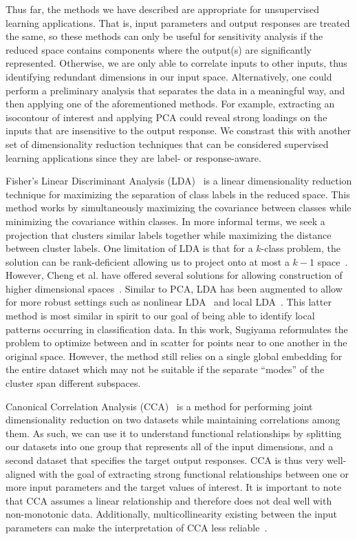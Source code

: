 Thus far, the methods we have described are appropriate for unsupervised learning applications.
%
That is, input parameters and output responses are treated the same, so these methods can only be useful for sensitivity analysis if the reduced space contains components where the output(s) are significantly represented.
%
Otherwise, we are only able to correlate inputs to other inputs, thus identifying redundant dimensions in our input space.
%
Alternatively, one could perform a preliminary analysis that separates the data in a meaningful way, and then applying one of the aforementioned methods.
%
For example, extracting an isocontour of interest and applying PCA could reveal strong loadings on the inputs that are insensitive to the output response.
%
We constrast this with another set of dimensionality reduction techniques that can be considered supervised learning applications since they are label- or response-aware.

Fisher's Linear Discriminant Analysis (LDA)~\cite{Fisher1936} is a linear dimensionality reduction technique for maximizing the separation of class labels in the reduced space.
%
This method works by simultaneously maximizing the covariance between classes while minimizing the covariance within classes.
%
In more informal terms, we seek a projection that clusters similar labels together while maximizing the distance between cluster labels.
%
One limitation of LDA is that for a $k$-class problem, the solution can be rank-deficient allowing us to project onto at most a $k-1$ space~\cite{MaszczykDuch2008}.
%
However, Cheng et al. have offered several solutions for allowing construction of higher dimensional spaces~\cite{ChengZhuangYang1992}.
%
Similar to PCA, LDA has been augmented to allow for more robust settings such as nonlinear LDA~\cite{MikaRatschWeston1999,McLachlan2004} and local LDA~\cite{Sugiyama2006}.
%
This latter method is most similar in spirit to our goal of being able to identify local patterns occurring in classification data.
%
In this work, Sugiyama reformulates the problem to optimize between and in scatter for points near to one another in the original space.
%
However, the method still relies on a single global embedding for the entire dataset which may not be suitable if the separate ``modes'' of the cluster span different subspaces.

Canonical Correlation Analysis (CCA)~\cite{Hotelling1935,HardoonSzedmakShawe-Taylor2004} is a method for performing joint dimensionality reduction on two datasets while maintaining correlations among them.
%
As such, we can use it to understand functional relationships by splitting our datasets into one group that represents all of the input dimensions, and a second dataset that specifies the target output responses.
%
CCA is thus very well-aligned with the goal of extracting strong functional relationships between one or more input parameters and the target values of interest.
%
It is important to note that CCA assumes a linear relationship and therefore does not deal well with non-monotonic data.
%
Additionally, multicollinearity existing between the input parameters can make the interpretation of CCA less reliable~\cite{HairAndersonTatham1998}.

